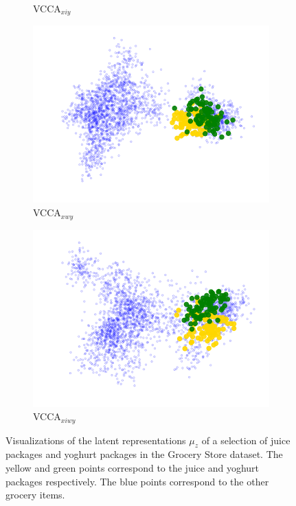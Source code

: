 \begin{figure}[t]
\begin{subfigure}[b]{0.3\textwidth}
         \caption{VCCA$_{x i y}$}
         \label{fig:pca_vcca_xiy_juice_yoghurt}
     \end{subfigure} 
     \begin{subfigure}[b]{0.3\textwidth}
         \centering
         \includegraphics[width=\textwidth]{PaperB/figures_and_tables/latent_space_visualizations/juice_yoghurt_new/pca_latent_juice_yoghurt_vcca_xwy_seed2.png}
         \caption{VCCA$_{x w y}$}
         \label{fig:pca_vcca_xwy_juice_yoghurt}
     \end{subfigure} 
     \begin{subfigure}[b]{0.3\textwidth}
         \centering
         \includegraphics[width=\textwidth]{PaperB/figures_and_tables/latent_space_visualizations/juice_yoghurt_new/pca_latent_juice_yoghurt_vcca_xiwy_seed2.png}
         \caption{VCCA$_{x i w y}$}
         \label{fig:pca_vcca_xiwy_juice_yoghurt}
     \end{subfigure} 
    \caption{Visualizations of the latent representations $\mu_{z}$ of a selection of juice packages and yoghurt packages in the Grocery Store dataset. The yellow and green points correspond to the juice and yoghurt packages respectively. The blue points correspond to the other grocery items. 
	}
    \label{fig:2d_visualizations_pca_juice_yoghurt}
\end{figure}

